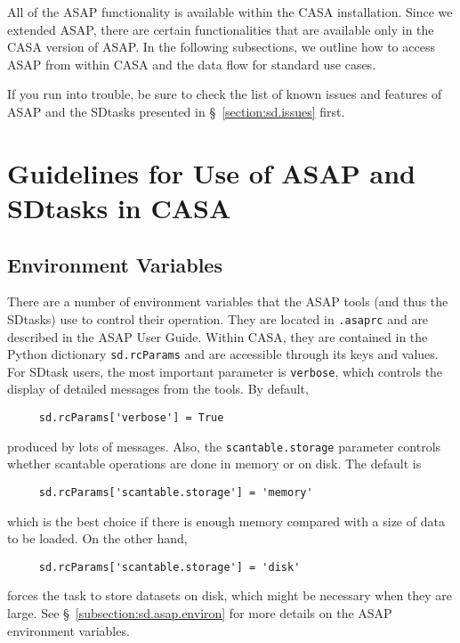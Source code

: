 All of the ASAP functionality is available within the CASA
installation.  Since we extended ASAP, there
are certain functionalities that are available only in the CASA version of ASAP.
In the following subsections, we outline how to access ASAP
from within CASA and the data flow for standard use cases.

If you run into trouble, be sure to check the list of known issues
and features of ASAP and the SDtasks presented in 
\S~\ref{section:sd.issues} first.



\section{Guidelines for Use of ASAP and SDtasks in CASA}
\label{section:sd.intro}

\subsection{Environment Variables}
\label{section:sd.intro.env}

There are a number of environment variables that the ASAP tools
(and thus the SDtasks) use to control their operation.
They are located in {\tt .asaprc} and are described in the ASAP User Guide.
Within CASA, they are contained in the
Python dictionary {\tt sd.rcParams} and are accessible through
its keys and values.  For SDtask users, the most important parameter is
{\tt verbose}, which controls the display of detailed
messages from the tools. By default,
\small
\begin{verbatim}
     sd.rcParams['verbose'] = True
\end{verbatim}
\normalsize
produced by lots of messages.  Also, the {\tt scantable.storage}
parameter controls whether scantable operations are done
in memory or on disk.  The default is  
\small
\begin{verbatim}
     sd.rcParams['scantable.storage'] = 'memory'  
\end{verbatim}
\normalsize
which is the best choice if there is enough memory
compared with a size of data to be loaded.  On the other hand,
\small
\begin{verbatim}
     sd.rcParams['scantable.storage'] = 'disk'
\end{verbatim}
\normalsize
forces the task to store datasets on disk, which might be necessary when they are large.
See \S~\ref{subsection:sd.asap.environ} for more details on the
ASAP environment variables.

